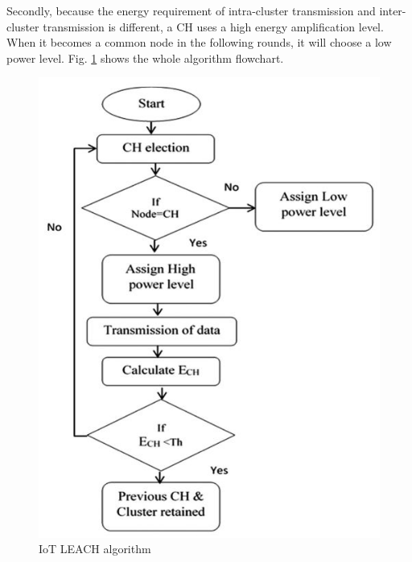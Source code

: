 \documentclass[11pt]{report}
\begin{document}
\begin{itemize}
		\noindent Secondly, because the energy requirement of intra-cluster transmission and inter-cluster transmission is different, a CH uses a high energy amplification level. When it becomes a common node in the following rounds, it will choose a low power level. Fig. \ref{fig1} shows the whole algorithm flowchart.
		\begin{figure}[h!]
			\centering
			\includegraphics[width=0.5\linewidth]{1th.jpg}
			\caption{IoT LEACH algorithm}
			\label{fig1}
		\end{figure}
	\end{itemize}
\end{document}
